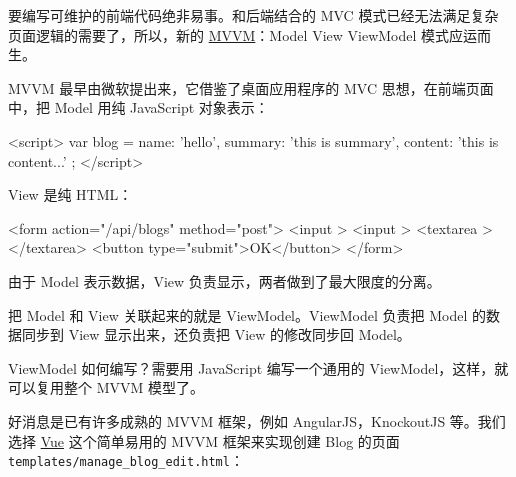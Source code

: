 要编写可维护的前端代码绝非易事。和后端结合的 MVC
模式已经无法满足复杂页面逻辑的需要了，所以，新的
\href{http://en.wikipedia.org/wiki/Model_View_ViewModel}{MVVM}：Model
View ViewModel 模式应运而生。

MVVM 最早由微软提出来，它借鉴了桌面应用程序的 MVC 思想，在前端页面中，把
Model 用纯 JavaScript 对象表示：

\begin{pythoncode}
<script>
    var blog = {
        name: 'hello',
        summary: 'this is summary',
        content: 'this is content...'
    };
</script>
\end{pythoncode}

View 是纯 HTML：

\begin{pythoncode}
<form action="/api/blogs" method="post">
    <input >
    <input >
    <textarea ></textarea>
    <button type="submit">OK</button>
</form>
\end{pythoncode}

由于 Model 表示数据，View 负责显示，两者做到了最大限度的分离。

把 Model 和 View 关联起来的就是 ViewModel。ViewModel 负责把 Model
的数据同步到 View 显示出来，还负责把 View 的修改同步回 Model。

ViewModel 如何编写？需要用 JavaScript 编写一个通用的
ViewModel，这样，就可以复用整个 MVVM 模型了。

好消息是已有许多成熟的 MVVM 框架，例如 AngularJS，KnockoutJS
等。我们选择 \href{http://vuejs.org/}{Vue} 这个简单易用的 MVVM
框架来实现创建 Blog 的页面\texttt{templates/manage\_blog\_edit.html}：

